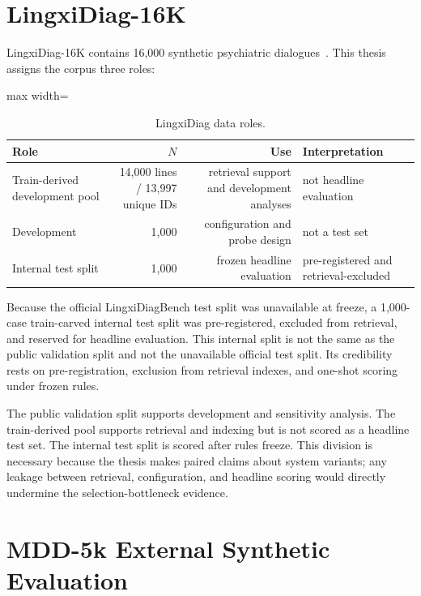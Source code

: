 \section{LingxiDiag-16K}

LingxiDiag-16K contains 16,000 synthetic psychiatric dialogues~\citep{xu2026lingxidiagbench}. This thesis assigns the corpus three roles:

\begin{table}[htbp]
\centering
\caption{LingxiDiag data roles.}
\label{tab:data-roles-rewrite}
\begin{adjustbox}{max width=\textwidth}
\begin{tabular}{lrrl}
\toprule
Role & $N$ & Use & Interpretation\\
\midrule
Train-derived development pool & 14,000 lines / 13,997 unique IDs & retrieval support and development analyses & not headline evaluation\\
Development & 1,000 & configuration and probe design & not a test set\\
Internal test split & 1,000 & frozen headline evaluation & pre-registered and retrieval-excluded\\
\bottomrule
\end{tabular}
\end{adjustbox}
\end{table}

Because the official LingxiDiagBench test split was unavailable at freeze, a 1,000-case train-carved internal test split was pre-registered, excluded from retrieval, and reserved for headline evaluation. This internal split is not the same as the public validation split and not the unavailable official test split. Its credibility rests on pre-registration, exclusion from retrieval indexes, and one-shot scoring under frozen rules.

The public validation split supports development and sensitivity analysis. The train-derived pool supports retrieval and indexing but is not scored as a headline test set. The internal test split is scored after rules freeze. This division is necessary because the thesis makes paired claims about system variants; any leakage between retrieval, configuration, and headline scoring would directly undermine the selection-bottleneck evidence.

\section{MDD-5k External Synthetic Evaluation}

